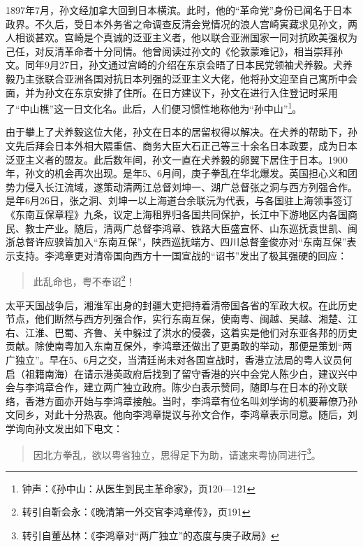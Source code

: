 1897年7月，孙文经加拿大回到日本横滨。此时，他的“革命党”身份已闻名于日本政界。不久后，受日本外务省之命调查反清会党情况的浪人宫崎寅藏求见孙文，两人相谈甚欢。宫崎是个真诚的泛亚主义者，他以联合亚洲国家一同对抗欧美强权为己任，对反清革命者十分同情。他曾阅读过孙文的《伦敦蒙难记》，相当崇拜孙文。同年9月27日，孙文通过宫崎的介绍在东京会晤了日本民党领袖犬养毅。犬养毅乃主张联合亚洲各国对抗日本列强的泛亚主义大佬，他将孙文迎至自己寓所中会面，并为孙文在东京安排了住所。在日方建议下，孙文在进行入住登记时采用了“中山樵”这一日文化名。此后，人们便习惯性地称他为“孙中山”\footnote{钟声：《孙中山：从医生到民主革命家》，页120—121}。

由于攀上了犬养毅这位大佬，孙文在日本的居留权得以解决。在犬养的帮助下，孙文先后拜会日本外相大隈重信、商务大臣大石正己等三十余名日本政要，成为日本泛亚主义者的盟友。此后数年间，孙文一直在犬养毅的卵翼下居住于日本。1900年，孙文的机会再次出现。是年5、6月间，庚子拳乱在华北爆发。英国担心义和团势力侵入长江流域，遂策动清两江总督刘坤一、湖广总督张之洞与西方列强合作。是年6月26日，张之洞、刘坤一以上海道台余联沅为代表，与各国驻上海领事签订《东南互保章程》九条，议定上海租界归各国共同保护，长江中下游地区内各国商民、教士产业。随后，清两广总督李鸿章、铁路大臣盛宣怀、山东巡抚袁世凯、闽浙总督许应骙皆加入“东南互保”，陕西巡抚端方、四川总督奎俊亦对“东南互保”表示支持。李鸿章更对清帝国向西方十一国宣战的“诏书”发出了极其强硬的回应：

\begin{quote}

此乱命也，粤不奉诏\footnote{转引自靳会永：《晚清第一外交官李鸿章传》，页191}！

\end{quote}

太平天国战争后，湘淮军出身的封疆大吏把持着清帝国各省的军政大权。在此历史节点，他们断然与西方列强合作，实行东南互保，使南粤、闽越、吴越、湘楚、江右、江淮、巴蜀、齐鲁、关中躲过了洪水的侵袭，这着实是他们对东亚各邦的历史贡献。除使南粤加入东南互保外，李鸿章还做出了更勇敢的举动，那便是策划“两广独立”。早在5、6月之交，当清廷尚未对各国宣战时，香港立法局的粤人议员何启（祖籍南海）在请示港英政府后找到了留守香港的兴中会党人陈少白，建议兴中会与李鸿章合作，建立两广独立政府。陈少白表示赞同，随即与在日本的孙文联络，香港方面亦开始与李鸿章接触。当时，李鸿章有位名叫刘学询的机要幕僚乃孙文同乡，对此十分热衷。他向李鸿章提议与孙文合作，李鸿章表示同意。随后，刘学询向孙文发出如下电文：


\begin{quote}

因北方拳乱，欲以粤省独立，思得足下为助，请速来粤协同进行\footnote{转引自董丛林：《李鸿章对“两广独立”的态度与庚子政局》}。

\end{quote}


